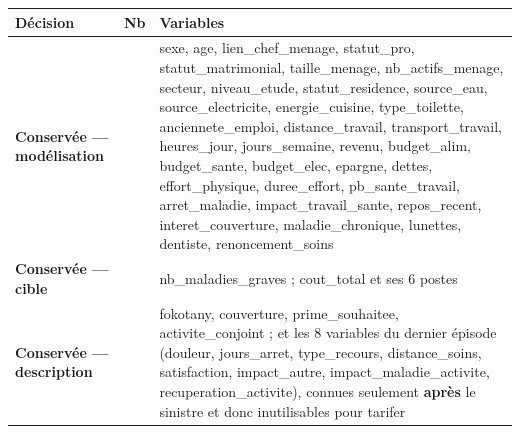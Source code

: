 \documentclass[

  french,

  10pt,

  a4paper,

]{article}
\newcounter{none} %
\begin{document}
{\def\LTcaptype{none} %

\begin{longtable}[]{@{}

  >{\raggedright\arraybackslash}p{}

  >{\raggedleft\arraybackslash}p{}

  >{\raggedright\arraybackslash}p{}@{}}

\toprule\noalign{}

\begin{minipage}[b]{\linewidth}\raggedright

Décision

\end{minipage} & \begin{minipage}[b]{\linewidth}\raggedleft

Nb

\end{minipage} & \begin{minipage}[b]{\linewidth}\raggedright

Variables

\end{minipage} \\

\midrule\noalign{}

\endhead

\bottomrule\noalign{}

\endlastfoot

\textbf{Conservée --- modélisation} & 36 & sexe, age, lien\_chef\_menage, statut\_pro, statut\_matrimonial, taille\_menage, nb\_actifs\_menage, secteur, niveau\_etude, statut\_residence, source\_eau, source\_electricite, energie\_cuisine, type\_toilette, anciennete\_emploi, distance\_travail, transport\_travail, heures\_jour, jours\_semaine, revenu, budget\_alim, budget\_sante, budget\_elec, epargne, dettes, effort\_physique, duree\_effort, pb\_sante\_travail, arret\_maladie, impact\_travail\_sante, repos\_recent, interet\_couverture, maladie\_chronique, lunettes, dentiste, renoncement\_soins \\

\textbf{Conservée --- cible} & 8 & nb\_maladies\_graves ; cout\_total et ses 6 postes \\

\textbf{Conservée --- description} & 12 & fokotany, couverture, prime\_souhaitee, activite\_conjoint ; et les 8 variables du dernier épisode (douleur, jours\_arret, type\_recours, distance\_soins, satisfaction, impact\_autre, impact\_maladie\_activite, recuperation\_activite), connues seulement \textbf{après} le sinistre et donc inutilisables pour tarifer \\


\end{longtable}}
\end{document}
